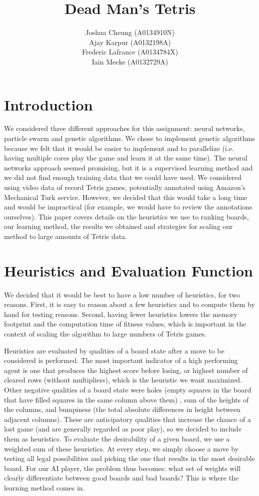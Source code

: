 \documentclass[12pt,a4paper]{report}
\title{Dead Man's Tetris}
\author{Joshua Cheung (A0134910N)\\Ajay Karpur (A0132198A)\\Frederic Lafrance (A0134784X)\\Iain Meeke (A0132729A)}
\begin{document}
\maketitle


\section{Introduction}
We considered three different approaches for this assignment: neural networks, particle swarm and genetic algorithms. We chose to implement genetic algorithms because we felt that it would be easier to implement and to parallelize (i.e. having multiple cores play the game and learn it at the same time). The neural networks approach seemed promising, but it is a supervised learning method and we did not find enough training data that we could have used. We considered using video data of record Tetris games, potentially annotated using Amazon’s Mechanical Turk service. However, we decided that this would take a long time and would be impractical (for example, we would have to review the annotations ourselves). This paper covers details on the heuristics we use to ranking boards, our learning method, the results we obtained and strategies for scaling our method to large amounts of Tetris data.

\section{Heuristics and Evaluation Function}
We decided that it would be best to have a low number of heuristics, for two reasons. First, it is easy to reason about a few heuristics and to compute them by hand for testing reasons. Second, having fewer heuristics lowers the memory footprint and the computation time of fitness values, which is important in the context of scaling the algorithm to large numbers of Tetris games.

Heuristics are evaluated by qualities of a board state after a move to be considered is performed. The most important indicator of a high performing agent is one that produces the highest score before losing, or highest number of cleared rows (without multipliers), which is the heuristic we want maximized. Other negative qualities of a board state were holes (empty squares in the board that have filled squares in the same column above them) , sum of the heights of the columns, and bumpiness (the total absolute differences in height between adjacent columns). \cite{leeyiyuan2013tetris} These are anticipatory qualities that increase the chance of a lost game (and are generally regarded as poor play), so we decided to include them as heuristics. To evaluate the desirability of a given board, we use a weighted sum of these heuristics. At every step, we simply choose a move by testing all legal possibilities and picking the one that results in the most desirable board. For our AI player, the problem thus becomes: what set of weights will clearly differentiate between good boards and bad boards? This is where the learning method comes in.
\end{document}
